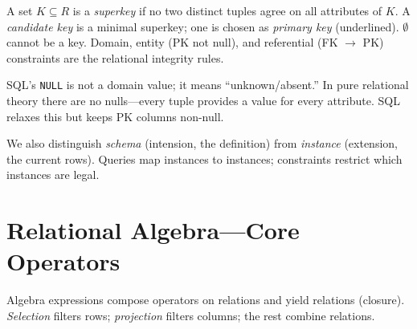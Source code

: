 \begin{definition}
A set $K\subseteq R$ is a \emph{superkey} if no two distinct tuples agree on all attributes of $K$. A \emph{candidate key} is a minimal superkey; one is chosen as \emph{primary key} (underlined). $\emptyset$ cannot be a key. Domain, entity (PK not null), and referential (FK $\to$ PK) constraints are the relational integrity rules.
\end{definition}

\begin{example}
SQL's \texttt{NULL} is not a domain value; it means ``unknown/absent.'' In pure relational theory there are no nulls---every tuple provides a value for every attribute. SQL relaxes this but keeps PK columns non-null.
\end{example}

We also distinguish \emph{schema} (intension, the definition) from \emph{instance} (extension, the current rows). Queries map instances to instances; constraints restrict which instances are legal.

\section{Relational Algebra---Core Operators}
\label{sec:algebra-core}

Algebra expressions compose operators on relations and yield relations (closure). \emph{Selection} filters rows; \emph{projection} filters columns; the rest combine relations.

